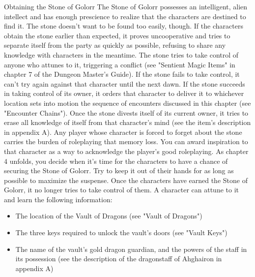 \documentclass[10pt,a4paper,twoside,twocolumn,openany,nodeprecatedcode]{dndbook}
\begin{document}
\begin{DndComment}{Obtaining the Stone of Golorr}
The Stone of Golorr possesses an intelligent, alien intellect and has enough prescience to realize that the characters are destined to find it. The stone doesn't want to be found too easily, though.
If the characters obtain the stone earlier than expected, it proves uncooperative and tries to separate itself from the party as quickly as possible, refusing to share any knowledge with characters in the meantime. The stone tries to take control of anyone who attunes to it, triggering a conflict (see "Sentient Magic Items" in chapter 7 of the Dungeon Master's Guide). If the stone fails to take control, it can't try again against that character until the next dawn. If the stone succeeds in taking control of its owner, it orders that character to deliver it to whichever location sets into motion the sequence of encounters discussed in this chapter (see "Encounter Chains"). Once the stone divests itself of its current owner, it tries to erase all knowledge of itself from that character's mind (see the item's description in appendix A). Any player whose character is forced to forget about the stone carries the burden of roleplaying that memory loss. You can award inspiration to that character as a way to acknowledge the player's good roleplaying.
As chapter 4 unfolds, you decide when it's time for the characters to have a chance of securing the Stone of Golorr. Try to keep it out of their hands for as long as possible to maximize the suspense.
Once the characters have earned the Stone of Golorr, it no longer tries to take control of them. A character can attune to it and learn the following information:
\begin{itemize}

\item The location of the Vault of Dragons (see "Vault of Dragons")
\item The three keys required to unlock the vault's doors (see "Vault Keys")
\item The name of the vault's gold dragon guardian, and the powers of the staff in its possession (see the description of the dragonstaff of Ahghairon in appendix A)
\end{itemize}


\end{DndComment}
\end{document}
